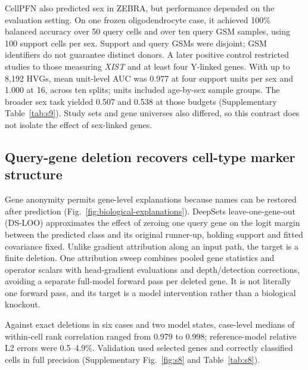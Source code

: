CellPFN also predicted sex in ZEBRA, but performance depended on the evaluation setting. On one frozen oligodendrocyte case, it achieved 100\% balanced accuracy over 50 query cells and over ten query GSM samples, using 100 support cells per sex. Support and query GSMs were disjoint; GSM identifiers do not guarantee distinct donors. A later positive control restricted studies to those measuring \textit{XIST} and at least four Y-linked genes. With up to 8,192 HVGs, mean unit-level AUC was 0.977 at four support units per sex and 1.000 at 16, across ten splits; units included age-by-sex sample groups. The broader sex task yielded 0.507 and 0.538 at those budgets (Supplementary Table~\ref{tab:s9}). Study sets and gene universes also differed, so this contrast does not isolate the effect of sex-linked genes. 

\subsection*{Query-gene deletion recovers cell-type marker structure}

Gene anonymity permits gene-level explanations because names can be restored after prediction (Fig.~\ref{fig:biological-explanations}). DeepSets leave-one-gene-out (DS-LOO) approximates the effect of zeroing one query gene on the logit margin between the predicted class and its original runner-up, holding support and fitted covariance fixed. Unlike gradient attribution along an input path\cite{sundararajan2017ig}, the target is a finite deletion. One attribution sweep combines pooled gene statistics and operator scalars with head-gradient evaluations and depth/detection corrections, avoiding a separate full-model forward pass per deleted gene. It is not literally one forward pass, and its target is a model intervention rather than a biological knockout.

Against exact deletions in six cases and two model states, case-level medians of within-cell rank correlation ranged from 0.979 to 0.998; reference-model relative L2 errors were 0.5--4.9\%. Validation used selected genes and correctly classified cells in full precision (Supplementary Fig.~\ref{fig:s8} and Table~\ref{tab:s8}). 

